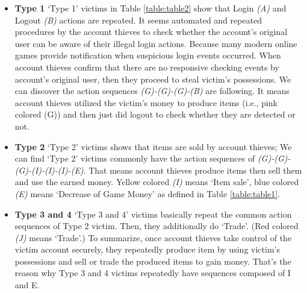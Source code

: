 \documentclass[conference]{IEEEtran}
\begin{document}
\begin{itemize}
\item\texttt{}\textbf{Type 1} `Type 1' victims in Table \ref{table:table2} show that Login \textit{(A)} and Logout \textit{(B)} actions are repeated. It seems automated and repeated procedures by the account thieves to check whether the account's original user can be aware of their illegal login actions. Because many modern online games provide notification when suspicious login events occurred. When account thieves confirm that there are no responsive checking events by account's original user, then they proceed to steal victim's possessions. We can discover the action sequences \textit{(G)-(G)-(G)-(B)} are following. It means account thieves utilized the victim's money to produce items (i.e., pink colored (G)) and then just did logout to check whether they are detected or not.  

\item\texttt{}\textbf{Type 2} `Type 2' victims shows that items are sold by account thieves; We can find `Type 2' victims commonly have the action sequences of \textit{(G)-(G)-(G)-(I)-(I)-(I)-(E)}. That means account thieves produce items then sell them and use the earned money. Yellow colored \textit{(I)} means `Item sale', blue colored \textit{(E)} means `Decrease of Game Money' as defined in Table \ref{table:table1}.
\item\texttt{}\textbf{Type 3 and 4} `Type 3 and 4' victims basically repeat the common action sequences of Type 2 victim. Then, they additionally do `Trade'. (Red colored \textit{(J)} means `Trade'.) To summarize, once account thieves take control of the victim account securely, they repeatedly produce item by using victim's possessions and sell or trade the produced items to gain money. That's the reason why Type 3 and 4 victims repeatedly have sequences composed of I and E. %
\end{itemize} 
\end{document}
